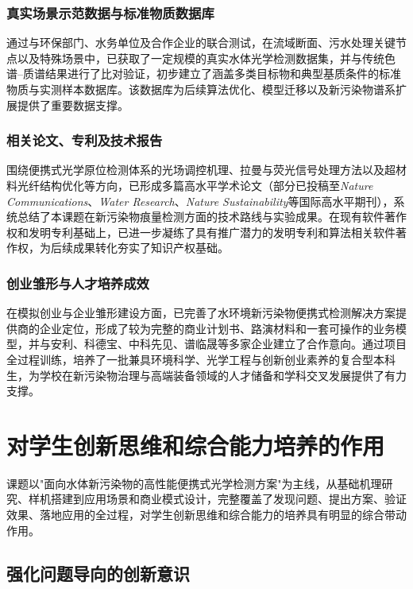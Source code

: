 \documentclass[12pt,a4paper]{article}
\begin{document}
\subsubsection{真实场景示范数据与标准物质数据库}

通过与环保部门、水务单位及合作企业的联合测试，在流域断面、污水处理关键节点以及特殊场景中，已获取了一定规模的真实水体光学检测数据集，并与传统色谱--质谱结果进行了比对验证，初步建立了涵盖多类目标物和典型基质条件的标准物质与实测样本数据库。该数据库为后续算法优化、模型迁移以及新污染物谱系扩展提供了重要数据支撑。

\subsubsection{相关论文、专利及技术报告}

围绕便携式光学原位检测体系的光场调控机理、拉曼与荧光信号处理方法以及超材料光纤结构优化等方向，已形成多篇高水平学术论文（部分已投稿至\textit{Nature Communications}、\textit{Water Research}、\textit{Nature Sustainability}等国际高水平期刊），系统总结了本课题在新污染物痕量检测方面的技术路线与实验成果。在现有软件著作权和发明专利基础上，已进一步凝练了具有推广潜力的发明专利和算法相关软件著作权，为后续成果转化夯实了知识产权基础。

\subsubsection{创业雏形与人才培养成效}

在模拟创业与企业雏形建设方面，已完善了水环境新污染物便携式检测解决方案提供商的企业定位，形成了较为完整的商业计划书、路演材料和一套可操作的业务模型，并与安利、科德宝、中科先见、谱临晟等多家企业建立了合作意向。通过项目全过程训练，培养了一批兼具环境科学、光学工程与创新创业素养的复合型本科生，为学校在新污染物治理与高端装备领域的人才储备和学科交叉发展提供了有力支撑。

\section{对学生创新思维和综合能力培养的作用}

课题以"面向水体新污染物的高性能便携式光学检测方案"为主线，从基础机理研究、样机搭建到应用场景和商业模式设计，完整覆盖了发现问题、提出方案、验证效果、落地应用的全过程，对学生创新思维和综合能力的培养具有明显的综合带动作用。

\subsection{强化问题导向的创新意识}
\end{document}
